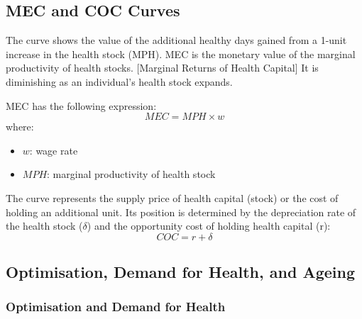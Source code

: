     \subsection{MEC and COC Curves}

        The  curve shows the value of the additional healthy days gained from a 1-unit increase in the health stock (MPH). MEC is the monetary value of the marginal productivity of health stocks. [Marginal Returns of Health Capital] It is diminishing as an individual's health stock expands.

        MEC has the following expression:
        $$MEC=MPH\times w$$
        where:
        \begin{itemize}
            \item $w$: wage rate
            \item $MPH$: marginal productivity of health stock
        \end{itemize}

        The  curve represents the supply price of health capital (stock) or the cost of holding an additional unit. Its position is determined by the depreciation rate of the health stock ($\delta$) and the opportunity cost of holding health capital (r):
        $$COC=r+\delta$$

    \subsection{Optimisation, Demand for Health, and Ageing}

        \subsubsection{Optimisation and Demand for Health}\label{grossman_demand}
    
